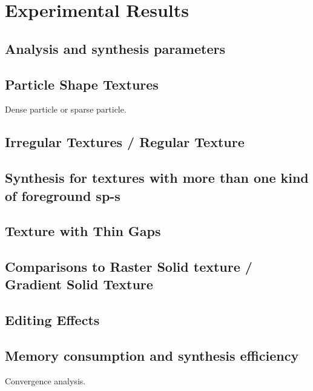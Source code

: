 \section{Experimental Results}
\label{sec:exper}

\subsection{Analysis and synthesis parameters}

\subsection{Particle Shape Textures}
Dense particle or sparse particle.

\subsection{Irregular Textures / Regular Texture}

\subsection{Synthesis for textures with more than one kind of foreground sp-s}

\subsection{Texture with Thin Gaps}

\subsection{Comparisons to Raster Solid texture / Gradient Solid Texture}

\subsection{Editing Effects}

\subsection{Memory consumption and synthesis efficiency}
Convergence analysis.